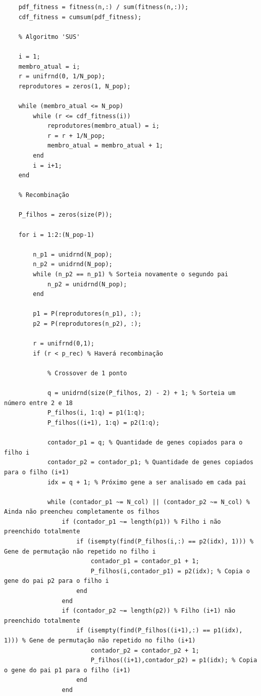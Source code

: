 \documentclass{report}
\begin{document}
\begin{lstlisting}
    pdf_fitness = fitness(n,:) / sum(fitness(n,:));
    cdf_fitness = cumsum(pdf_fitness);

    % Algoritmo 'SUS'

    i = 1;
    membro_atual = i;
    r = unifrnd(0, 1/N_pop);
    reprodutores = zeros(1, N_pop);

    while (membro_atual <= N_pop)
        while (r <= cdf_fitness(i))
            reprodutores(membro_atual) = i;
            r = r + 1/N_pop;
            membro_atual = membro_atual + 1;
        end
        i = i+1;
    end

    % Recombinação

    P_filhos = zeros(size(P));
    
    for i = 1:2:(N_pop-1)

        n_p1 = unidrnd(N_pop);
        n_p2 = unidrnd(N_pop);
        while (n_p2 == n_p1) % Sorteia novamente o segundo pai
            n_p2 = unidrnd(N_pop);
        end

        p1 = P(reprodutores(n_p1), :);
        p2 = P(reprodutores(n_p2), :);

        r = unifrnd(0,1);
        if (r < p_rec) % Haverá recombinação

            % Crossover de 1 ponto            

            q = unidrnd(size(P_filhos, 2) - 2) + 1; % Sorteia um número entre 2 e 18
            P_filhos(i, 1:q) = p1(1:q);
            P_filhos((i+1), 1:q) = p2(1:q);

            contador_p1 = q; % Quantidade de genes copiados para o filho i
            contador_p2 = contador_p1; % Quantidade de genes copiados para o filho (i+1)
            idx = q + 1; % Próximo gene a ser analisado em cada pai

            while (contador_p1 ~= N_col) || (contador_p2 ~= N_col) % Ainda não preencheu completamente os filhos
                if (contador_p1 ~= length(p1)) % Filho i não preenchido totalmente
                    if (isempty(find(P_filhos(i,:) == p2(idx), 1))) % Gene de permutação não repetido no filho i
                        contador_p1 = contador_p1 + 1;
                        P_filhos(i,contador_p1) = p2(idx); % Copia o gene do pai p2 para o filho i
                    end
                end
                if (contador_p2 ~= length(p2)) % Filho (i+1) não preenchido totalmente
                    if (isempty(find(P_filhos((i+1),:) == p1(idx), 1))) % Gene de permutação não repetido no filho (i+1)
                        contador_p2 = contador_p2 + 1;
                        P_filhos((i+1),contador_p2) = p1(idx); % Copia o gene do pai p1 para o filho (i+1)
                    end
                end


\end{lstlisting}
\end{document}
